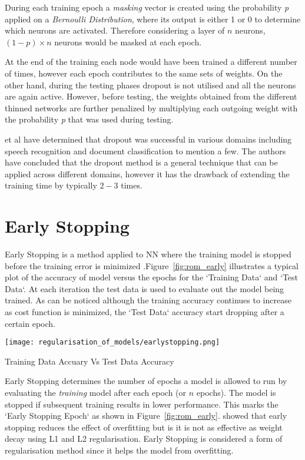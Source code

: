 During each training epoch a \textit{masking} vector is created using the probability \textit{p} applied on a \textit{Bernoulli Distribution}, where its output is either 1 or 0 to determine which neurons are activated. Therefore considering a layer of $n$ neurons, $(1-p) \times n$ neurons would be masked at each epoch. 

At the end of the training each node would have been trained a different number of times, however each epoch contributes to the same sets of weights. On the other hand, during the testing phases dropout is not utilised and all the neurons are again active. However, before testing, the weights obtained from the different thinned networks are further penalized by multiplying each outgoing weight with the probability \textit{p} that was used during testing.

\citet{srivastava2014dropout} et al have determined that dropout was successful in various domains including speech recognition and document classification to mention a few. The authors have concluded that the dropout method is a general technique that can be applied across different domains, however it has the drawback of extending the training time by typically $2-3$ times.


\section{Early Stopping} 



Early Stopping is a method applied to NN where the training model is stopped before the training error is minimized \citep{Sarle95stoppedtraining}.Figure~\ref{fig:rom_early} illustrates a typical plot of the accuracy of model versus the epochs for the `Training Data` and `Test Data`. At each iteration the test data is used to evaluate out the model being trained. As can be noticed although the training accuracy continues to increase as cost function is minimized, the `Test Data` accuracy start dropping after a certain epoch.

\begin{marginfigure}%
	\centering
	\texttt{[image: regularisation\_of\_models/earlystopping.png]}
	\caption{Training Data Accuary Vs Test Data Accuracy}
	\label{fig:rom_early}
\end{marginfigure}

Early Stopping determines the number of epochs a model is allowed to run by evaluating the  \textit{training} model after each epoch (or $n$ epochs). The model is stopped if subsequent training results in lower performance. This marks the `Early Stopping Epoch` as shown in Figure~\ref{fig:rom_early}. \citet{zur2009noise} showed that early stopping reduces the effect of overfitting but is it is not as effective as weight decay using L1 and L2 regularisation. Early Stopping is considered a form of regularisation method since it helps the model from overfitting.



